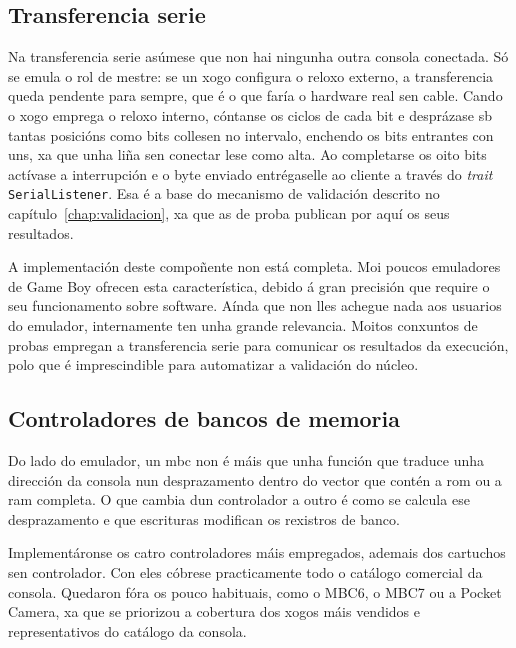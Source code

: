 \subsection{Transferencia serie}
Na transferencia serie asúmese que non hai ningunha outra consola conectada.
Só se emula o rol de mestre: se un xogo configura o reloxo externo, a transferencia queda pendente para sempre, que é o que faría o hardware real sen cable.
Cando o xogo emprega o reloxo interno, cóntanse os ciclos de cada bit e desprázase \acrshort{sb} tantas posicións como bits collesen no intervalo,
enchendo os bits entrantes con uns, xa que unha liña sen conectar lese como alta.
Ao completarse os oito bits actívase a interrupción e o byte enviado entrégaselle ao cliente a través do \textit{trait} \texttt{SerialListener}.
Esa é a base do mecanismo de validación descrito no capítulo~\ref{chap:validacion}, xa que as  de proba publican por aquí os seus resultados.

A implementación deste compoñente non está completa. Moi poucos emuladores de Game Boy ofrecen esta característica, debido á gran precisión
que require o seu funcionamento sobre software.
Aínda que non lles achegue nada aos usuarios do emulador, internamente ten unha grande relevancia.
Moitos conxuntos de probas empregan a transferencia serie para comunicar os resultados da execución,
polo que é imprescindible para automatizar a validación do núcleo.

\subsection{Controladores de bancos de memoria}

Do lado do emulador, un \acrshort{mbc} non é máis que unha función que traduce unha dirección da consola
nun desprazamento dentro do vector que contén a \acrshort{rom} ou a \acrshort{ram} completa.
O que cambia dun controlador a outro é como se calcula ese desprazamento e que escrituras modifican os rexistros de banco.

Implementáronse os catro controladores máis empregados, ademais dos cartuchos sen controlador.
Con eles cóbrese practicamente todo o catálogo comercial da consola.
Quedaron fóra os pouco habituais, como o MBC6, o MBC7 ou a Pocket Camera,
xa que se priorizou a cobertura dos xogos máis vendidos e representativos do catálogo da consola.

